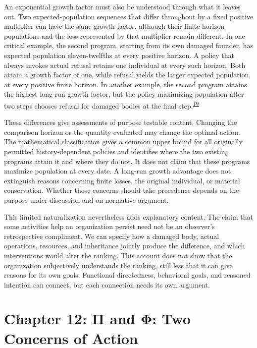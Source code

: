\documentclass[
  english,
  11pt,
  oneside]{book}
\begin{document}
An exponential growth factor must also be understood through what it leaves out. Two expected-population sequences that differ throughout by a fixed positive multiplier can have the same growth factor, although their finite-horizon populations and the loss represented by that multiplier remain different. In one critical example, the second program, starting from its own damaged founder, has expected population eleven-twelfths at every positive horizon. A policy that always invokes actual refusal retains one individual at every such horizon. Both attain a growth factor of one, while refusal yields the larger expected population at every positive finite horizon. In another example, the second program attains the highest long-run growth factor, but the policy maximizing population after two steps chooses refusal for damaged bodies at the final step.\textsuperscript{\hyperlink{ph-note-19}{19}}

These differences give assessments of purpose testable content. Changing the comparison horizon or the quantity evaluated may change the optimal action. The mathematical classification gives a common upper bound for all originally permitted history-dependent policies and identifies where the two existing programs attain it and where they do not. It does not claim that these programs maximize population at every date. A long-run growth advantage does not extinguish reasons concerning finite losses, the original individual, or material conservation. Whether those concerns should take precedence depends on the purpose under discussion and on normative argument.

\begingroup{}

This limited naturalization nevertheless adds explanatory content. The claim that some activities help an organization persist need not be an observer's retrospective compliment. We can specify how a damaged body, actual operations, resources, and inheritance jointly produce the difference, and which interventions would alter the ranking. This account does not show that the organization subjectively understands the ranking, still less that it can give reasons for its own goals. Functional directedness, behavioral goals, and reasoned intention can connect, but each connection needs its own argument.

\par\endgroup

\chapter{Chapter 12: Π and Φ: Two Concerns of Action}\label{ph-ch-12}
\end{document}
